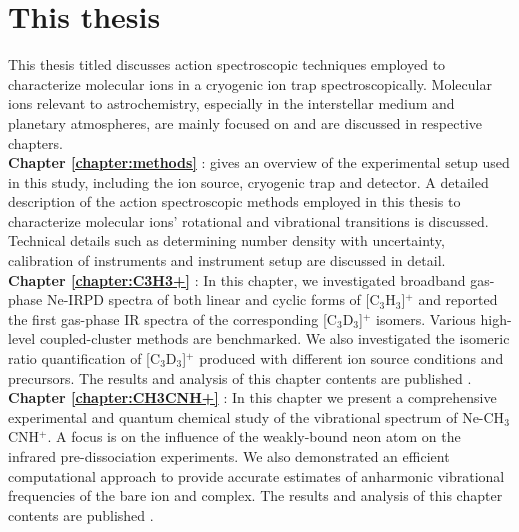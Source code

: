 \section{This thesis}

This thesis titled  discusses action spectroscopic techniques employed to characterize molecular ions in a cryogenic ion trap spectroscopically. Molecular ions relevant to astrochemistry, especially in the interstellar medium and planetary atmospheres, are mainly focused on and are discussed in respective chapters.\\

\textbf{Chapter \ref{chapter:methods}} \emph{}:  gives an overview of the experimental setup used in this study, including the ion source, cryogenic trap and detector. A detailed description of the action spectroscopic methods employed in this thesis to characterize molecular ions' rotational and vibrational transitions is discussed. Technical details such as determining number density with uncertainty, calibration of instruments and instrument setup are discussed in detail.\\

\textbf{Chapter \ref{chapter:C3H3+}} \emph{}: In this chapter, we investigated broadband gas-phase Ne-IRPD spectra of both linear and cyclic forms of [C$_3$H$_3$]$^+$ and reported the first gas-phase IR spectra of the corresponding [C$_3$D$_3$]$^+$ isomers. Various high-level coupled-cluster methods are benchmarked. We also investigated the isomeric ratio quantification of [C$_3$D$_3$]$^+$ produced with different ion source conditions and precursors. 
The results and analysis of this chapter contents are published \cite{Marimuthu2020LaboratorySpectroscopy}.\\

\textbf{Chapter \ref{chapter:CH3CNH+}} \emph{}: In this chapter we present a comprehensive experimental and quantum chemical study of the vibrational spectrum of Ne-CH$_3$CNH$^+$. A focus is on the influence of the weakly-bound neon atom on the infrared pre-dissociation experiments. We also demonstrated an efficient computational approach to provide accurate estimates of anharmonic vibrational frequencies of the bare ion and complex. The results and analysis of this chapter contents are published \cite{Marimuthu2021InfraredCH3CNH+}.\\

